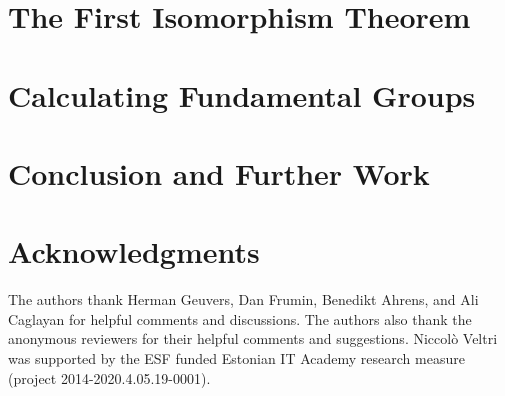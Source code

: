 \documentclass{lmcs}
\theoremstyle{plain}
\theoremstyle{definition}
\begin{document}
\section{The First Isomorphism Theorem}
\label{sec:isomorphism_theorem}


\section{Calculating Fundamental Groups}
\label{sec:fundamental_groups}


\section{Conclusion and Further Work}
\label{sec:conclusion}



\section*{Acknowledgments}
The authors thank Herman Geuvers, Dan Frumin, Benedikt Ahrens, and Ali Caglayan for helpful comments and discussions.
The authors also thank the anonymous reviewers for their helpful comments and suggestions.
Niccol{\`o} Veltri was supported by the ESF funded
Estonian IT Academy research measure (project 2014-2020.4.05.19-0001).



\end{document}
